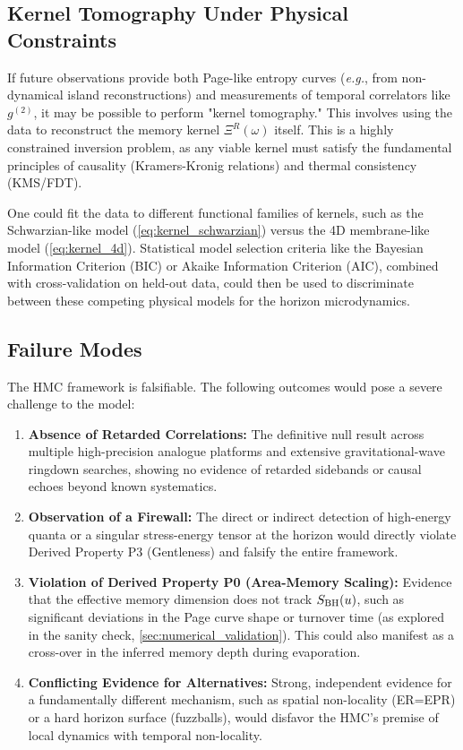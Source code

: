 \documentclass[11pt,a4paper]{article}
\newcommand{\eg}{\textit{e.g.}\xspace}
\newcommand{\HMC}{\textsc{HMC}\xspace}
\theoremstyle{plain}
\theoremstyle{definition}
\theoremstyle{remark}
\begin{document}
\subsection{Kernel Tomography Under Physical Constraints}
If future observations provide both Page-like entropy curves (\eg, from non-dynamical island reconstructions) and measurements of temporal correlators like $g^{(2)}$, it may be possible to perform "kernel tomography." This involves using the data to reconstruct the memory kernel $\Xi^R(\omega)$ itself. This is a highly constrained inversion problem, as any viable kernel must satisfy the fundamental principles of causality (Kramers-Kronig relations) and thermal consistency (KMS/FDT).

One could fit the data to different functional families of kernels, such as the Schwarzian-like model (\eqref{eq:kernel_schwarzian}) versus the 4D membrane-like model (\eqref{eq:kernel_4d}). Statistical model selection criteria like the Bayesian Information Criterion (BIC) or Akaike Information Criterion (AIC), combined with cross-validation on held-out data, could then be used to discriminate between these competing physical models for the horizon microdynamics.

\subsection{Failure Modes}
The \HMC{} framework is falsifiable. The following outcomes would pose a severe challenge to the model:
\begin{enumerate}
    \item \textbf{Absence of Retarded Correlations:} The definitive null result across multiple high-precision analogue platforms and extensive gravitational-wave ringdown searches, showing no evidence of retarded sidebands or causal echoes beyond known systematics.
    \item \textbf{Observation of a Firewall:} The direct or indirect detection of high-energy quanta or a singular stress-energy tensor at the horizon would directly violate Derived Property P3 (Gentleness) and falsify the entire framework.
    \item \textbf{Violation of Derived Property P0 (Area-Memory Scaling):} Evidence that the effective memory dimension does not track $S_{\rm BH}(u)$, such as significant deviations in the Page curve shape or turnover time (as explored in the sanity check, \cref{sec:numerical_validation}). This could also manifest as a cross-over in the inferred memory depth during evaporation.
    \item \textbf{Conflicting Evidence for Alternatives:} Strong, independent evidence for a fundamentally different mechanism, such as spatial non-locality (ER=EPR) or a hard horizon surface (fuzzballs), would disfavor the \HMC{}'s premise of local dynamics with temporal non-locality.
\end{enumerate}
\end{document}
